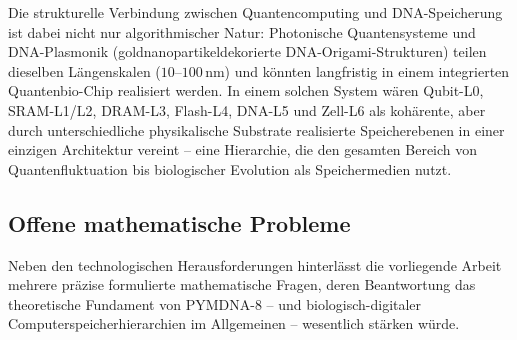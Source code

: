 ﻿\documentclass[a4paper,12pt]{article}
\theoremstyle{definition}
\begin{document}
Die strukturelle Verbindung zwischen Quantencomputing und DNA-Speicherung ist dabei nicht nur algorithmischer Natur: Photonische Quantensysteme und DNA-Plasmonik (goldnanopartikeldekorierte DNA-Origami-Strukturen) teilen dieselben Längenskalen ($10$--$100$\,nm) und könnten langfristig in einem integrierten Quantenbio-Chip realisiert werden. In einem solchen System wären Qubit-L0, SRAM-L1/L2, DRAM-L3, Flash-L4, DNA-L5 und Zell-L6 als kohärente, aber durch unterschiedliche physikalische Substrate realisierte Speicherebenen in einer einzigen Architektur vereint -- eine Hierarchie, die den gesamten Bereich von Quantenfluktuation bis biologischer Evolution als Speichermedien nutzt.

\subsection{Offene mathematische Probleme}

Neben den technologischen Herausforderungen hinterlässt die vorliegende Arbeit mehrere präzise formulierte mathematische Fragen, deren Beantwortung das theoretische Fundament von PYMDNA-8 -- und biologisch-digitaler Computerspeicherhierarchien im Allgemeinen -- wesentlich stärken würde.
\end{document}
